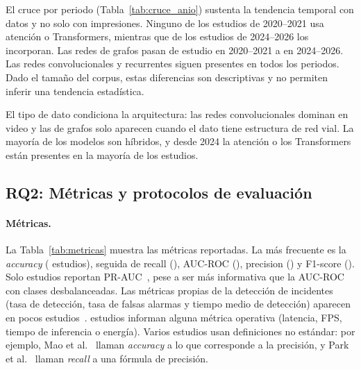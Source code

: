 \documentclass[12pt, a4paper]{article}
\begin{document}


El cruce por periodo (Tabla~\ref{tab:cruce_anio}) sustenta la tendencia temporal con datos y no solo con impresiones. Ninguno de los \NperiodoAntes{} estudios de 2020--2021 usa atenci\'{o}n o Transformers, mientras que \XRecienteTransf{} de los \NperiodoReciente{} estudios de 2024--2026 los incorporan. Las redes de grafos pasan de \XAntesGrafo{} estudio en 2020--2021 a \XRecienteGrafo{} en 2024--2026. Las redes convolucionales y recurrentes siguen presentes en todos los periodos. Dado el tama\~{n}o del corpus, estas diferencias son descriptivas y no permiten inferir una tendencia estad\'{i}stica.



\begin{hallazgo}
El tipo de dato condiciona la arquitectura: las redes convolucionales dominan en video y las de grafos solo aparecen cuando el dato tiene estructura de red vial. La mayor\'{i}a de los modelos son h\'{i}bridos, y desde 2024 la atenci\'{o}n o los Transformers est\'{a}n presentes en la mayor\'{i}a de los estudios.
\end{hallazgo}

\subsection{RQ2: M\'{e}tricas y protocolos de evaluaci\'{o}n}

\paragraph{M\'{e}tricas.} La Tabla~\ref{tab:metricas} muestra las m\'{e}tricas reportadas. La m\'{a}s frecuente es la \textit{accuracy} (\Nmetaccuracy{} estudios), seguida de recall (\Nmetrecall{}), AUC-ROC (\Nmetaucroc{}), precision (\Nmetprecision{}) y F1-score (\NmetFuno{}). Solo \Nmetprauc{} estudios reportan PR-AUC~\cite{chakraborty2023structural,wang2024multiscale}, pese a ser m\'{a}s informativa que la AUC-ROC con clases desbalanceadas. Las m\'{e}tricas propias de la detecci\'{o}n de incidentes (tasa de detecci\'{o}n, tasa de falsas alarmas y tiempo medio de detecci\'{o}n) aparecen en pocos estudios~\cite{fang2020deep,mehrannia2023deep,zhang2022automatic}. \Nmetoperativaslatenciafpsenergia{} estudios informan alguna m\'{e}trica operativa (latencia, FPS, tiempo de inferencia o energ\'{i}a). Varios estudios usan definiciones no est\'{a}ndar: por ejemplo, Mao et al.~\cite{mao2024detecting} llaman \textit{accuracy} a lo que corresponde a la precisi\'{o}n, y Park et al.~\cite{park2025graph} llaman \textit{recall} a una f\'{o}rmula de precisi\'{o}n.
\end{document}
